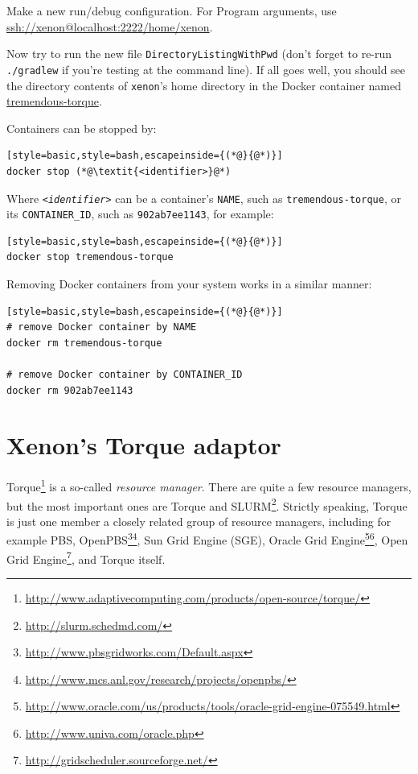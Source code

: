 \documentclass[12pt, a4paper, twoside, openany, titlepage]{book}
\begin{document}
Make a new run/debug configuration. For \textsf{Program arguments}, use \url{ssh://xenon@localhost:2222/home/xenon}.\label{eclipse-ssh-to-tremendous-torque}

Now try to run the new file \texttt{DirectoryListingWithPwd} (don't forget to re-run \texttt{./gradlew} if you're testing at the command line). If all goes well, you should see the directory contents of \texttt{xenon}'s home directory in the Docker container named \url{tremendous-torque}.

Containers can be stopped by:
\begin{lstlisting}[style=basic,style=bash,escapeinside={(*@}{@*)}]
docker stop (*@\textit{<identifier>}@*)
\end{lstlisting}

Where \texttt{\textit{<identifier>}} can be a container's \texttt{NAME}, such as \texttt{tremendous-torque}, or its \texttt{CONTAINER\_ID}, such as \texttt{902ab7ee1143}, for example:
\begin{lstlisting}[style=basic,style=bash,escapeinside={(*@}{@*)}]
docker stop tremendous-torque
\end{lstlisting}

Removing Docker containers from your system works in a similar manner:
\begin{lstlisting}[style=basic,style=bash,escapeinside={(*@}{@*)}]
# remove Docker container by NAME
docker rm tremendous-torque

# remove Docker container by CONTAINER_ID
docker rm 902ab7ee1143
\end{lstlisting} %


\section{Xenon's Torque adaptor}

Torque\footnote{\url{http://www.adaptivecomputing.com/products/open-source/torque/}} is a so-called \textit{resource manager}. There are quite a few resource managers, but the most important ones are Torque and SLURM\footnote{\url{http://slurm.schedmd.com/}}. Strictly speaking, Torque is just one member a closely related group of resource managers, including for example PBS, OpenPBS\footnote{\url{http://www.pbsgridworks.com/Default.aspx}}\footnote{\url{http://www.mcs.anl.gov/research/projects/openpbs/}}, Sun Grid Engine (SGE), Oracle Grid Engine\footnote{\url{http://www.oracle.com/us/products/tools/oracle-grid-engine-075549.html}}\footnote{\url{http://www.univa.com/oracle.php}}, Open Grid Engine\footnote{\url{http://gridscheduler.sourceforge.net/}}, and Torque itself.
\end{document}
